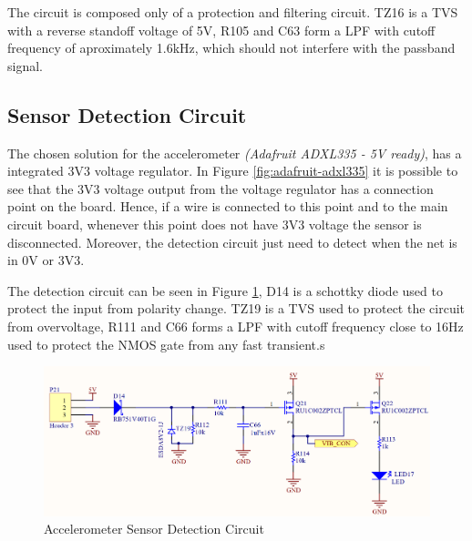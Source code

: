 	The circuit is composed only of a protection and filtering circuit. TZ16 is a TVS with a reverse standoff voltage of 5V, R105 and C63 form a LPF with cutoff frequency of aproximately 1.6kHz, which should not interfere with the passband signal.

\subsection{Sensor Detection Circuit}\label{ssec:accelerometer-sensor-detection-circuit}

	The chosen solution for the accelerometer \textit{(Adafruit ADXL335 - 5V ready)}, has a integrated 3V3 voltage regulator. In Figure \ref{fig:adafruit-adxl335} it is possible to see that the 3V3 voltage output from the voltage regulator has a connection point on the board. Hence, if a wire is connected to this point and to the main circuit board, whenever this point does not have 3V3 voltage the sensor is disconnected. Moreover, the detection circuit just need to detect when the net is in 0V or 3V3.
	\par
	The detection circuit can be seen in Figure \ref{fig:accelerometer-sensor-detection-circuit}, D14 is a schottky diode used to protect the input from polarity change. TZ19 is a TVS used to protect the circuit from overvoltage, R111 and C66 forms a LPF with cutoff frequency close to 16Hz used to protect the NMOS gate from any fast transient.s

	\begin{figure}[htbp]
		\centering
		\includegraphics[width=1\textwidth]{figuras/fig-accelerometer-sensor-detection-circuit.png}
		\caption{Accelerometer Sensor Detection Circuit}
		\label{fig:accelerometer-sensor-detection-circuit}
	\end{figure}